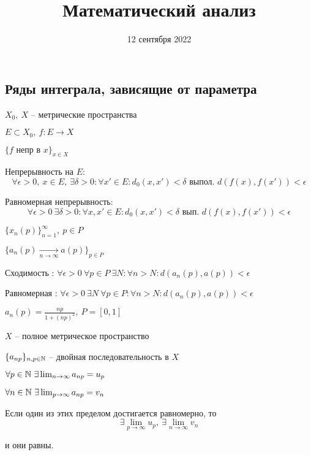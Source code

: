 


    \title{Математический анализ}
    \date{12 сентября 2022}
    \maketitle{}

    \pagebreak

    \subsection*{Ряды интеграла, зависящие от параметра}

    $X_0, \ X$ -- метрические пространства
    \par $E \subset X_0, \ f : E \rightarrow X$
    \par $\{f \text{ непр в } x\}_{x \in X}$
    \par Непрерывность на $E$:
    \[
        \forall \epsilon > 0, \ x \in E, \ \exists \delta > 0 : \forall x' \in E : d_0(x, x') < \delta \text{ выпол. } d(f(x), f(x')) < \epsilon    
    \]
    \par Равномерная непрерывность:
    \[
        \forall \epsilon > 0 \ \exists \delta > 0 : \forall x, x' \in E : d_0(x, x') < \delta \text{ вып. } d(f(x), f(x')) < \epsilon    
    \]

    \par $\{x_n(p)\}_{n = 1}^\infty, \ p \in P$
    \par $\{a_n(p) \xrightarrow[n \rightarrow \infty]{} a(p)\}_{p \in P}$
    \par Сходимость : $\forall \epsilon > 0 \ \forall p \in P \ \exists N : \forall n > N : d(a_n(p), a(p)) < \epsilon$
    \par Равномерная : $\forall \epsilon > 0 \ \exists N \ \forall p \in P : \forall n > N : d(a_n(p), a(p)) < \epsilon$

    \begin{illustration}
        $a_n(p) = \frac{np}{1 + (np)^2}, \ P = [0, 1]$
    \end{illustration}

    \begin{theorem}
        $X$ -- полное метрическое пространство
        \par $\{a_{np}\}_{n, p \in \mathbb{N}}$ -- двойная последовательность в $X$
        \par \quad $\forall p \in \mathbb{N} \ \exists \lim_{n \rightarrow \infty} a_{np} = u_p$
        \par \quad $\forall n \in \mathbb{N} \ \exists \lim_{p \rightarrow \infty} a_{np} = v_n$
        \par Если один из этих пределом достигается равномерно, то
        \[
            \exists \lim_{p \rightarrow \infty} u_p, \ \exists \lim_{n \rightarrow \infty} v_n
        \]
        \par и они равны.
    \end{theorem}

